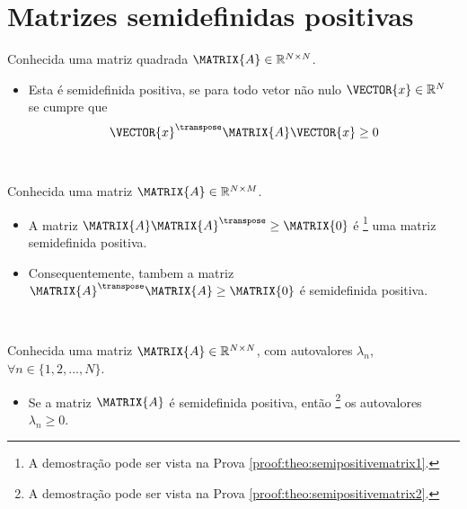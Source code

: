 \section{ Matrizes semidefinidas positivas}

\begin{definition}\label{def:semipositivematrix0}
Conhecida uma matriz quadrada $\MATRIX{A} \in \mathbb{R}^{N \times N}$. 
\begin{itemize}
\item Esta é semidefinida positiva, se para todo vetor não nulo $\VECTOR{x} \in \mathbb{R}^N$
se cumpre que \cite[pp. 159]{golub2013matrix} 
\begin{equation}
\VECTOR{x}^{\transpose} \MATRIX{A} \VECTOR{x} \geq 0
\end{equation}
\end{itemize}
\end{definition}

~

\begin{theorem}\label{theo:semipositivematrix1}
Conhecida uma matriz $\MATRIX{A} \in \mathbb{R}^{N \times M}$.
\begin{itemize}
\item A matriz $\MATRIX{A}\MATRIX{A}^{\transpose} \geq \MATRIX{0}$ é
\footnote{A demostração pode ser vista na Prova \ref{proof:theo:semipositivematrix1}.} 
uma matriz semidefinida positiva.
\item Consequentemente, tambem a matriz $\MATRIX{A}^{\transpose}\MATRIX{A}  \geq \MATRIX{0}$ é semidefinida positiva.
\end{itemize}
\end{theorem}

~

\begin{theorem}\label{theo:semipositivematrix2}
Conhecida uma matriz $\MATRIX{A} \in \mathbb{R}^{N \times N}$, com  autovalores $\lambda_n$,
$\forall n \in \{1, 2, ..., N\}$.
\begin{itemize}
\item Se a matriz $\MATRIX{A}$ é semidefinida positiva, então
\footnote{A demostração pode ser vista na Prova \ref{proof:theo:semipositivematrix2}.} 
os autovalores $\lambda_n \geq 0$.
\end{itemize}
\end{theorem}

